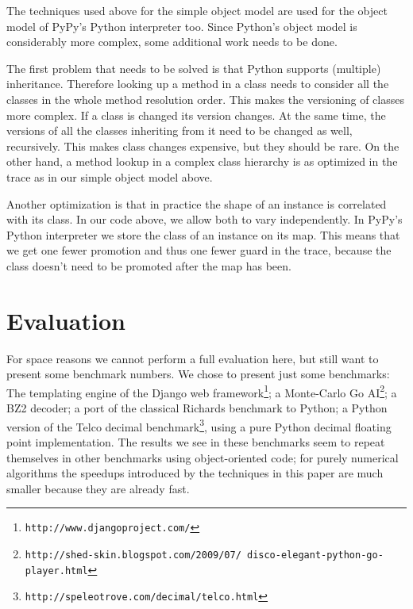 \documentclass[preprint]{sigplanconf}
\begin{document}
The techniques used above for the simple object model are used for the object
model of PyPy's Python interpreter too. Since Python's object model is
considerably more complex, some additional work needs to be done.

The first problem that needs to be solved is that Python supports (multiple)
inheritance. Therefore looking up a method in a class needs to consider all the
classes in the
whole method resolution order. This makes the versioning of classes more
complex. If a class is changed its version changes. At the same time, the
versions of all the classes inheriting from it need to be changed as well,
recursively. This makes class changes expensive, but they should be rare.  On the
other hand, a method lookup in a complex class hierarchy is as optimized in the
trace as in our simple object model above.

Another optimization is that in practice the shape of an instance is correlated
with its class. In our code above, we allow both to vary independently.
In PyPy's Python interpreter we store the class of an instance on its map. This
means that we get one fewer promotion and thus one fewer
guard in the trace, because the class doesn't need to be promoted after the
map has been.



%
%




\section{Evaluation}
\label{sec:evaluation}

For space reasons we cannot perform a full evaluation here, but still want to
present some benchmark numbers. We chose to present just some benchmarks: The
templating engine of the Django web
framework\footnote{\texttt{http://www.djangoproject.com/}}; a Monte-Carlo Go
AI\footnote{\texttt{http://shed-skin.blogspot.com/2009/07/
disco-elegant-python-go-player.html}}; a BZ2 decoder; a port of the classical
Richards benchmark to Python; a Python version of the Telco decimal
benchmark\footnote{\texttt{http://speleotrove.com/decimal/telco.html}}, using a
pure Python decimal floating point implementation. The results we see in these
benchmarks seem to repeat themselves in other benchmarks using object-oriented
code; for purely numerical algorithms the speedups introduced by the techniques
in this paper are much smaller because they are already fast.
\end{document}
